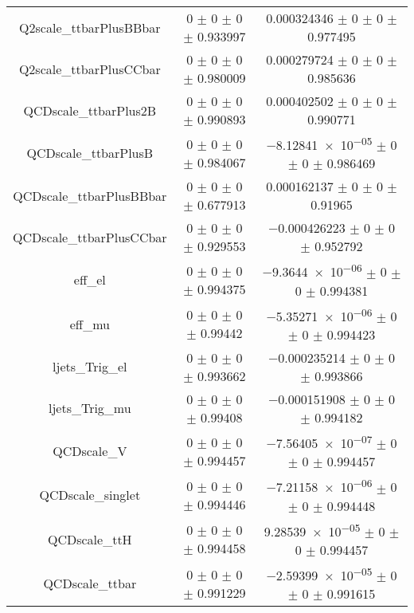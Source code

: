 \begin{table}
\begin{tabular}{ccc}
Q2scale\_ttbarPlusBBbar & \num{0} $\pm$ \num{0} $\pm$ \num{0} $\pm$ \num{0.933997} & \num{0.000324346} $\pm$ \num{0} $\pm$ \num{0} $\pm$ \num{0.977495}\\
Q2scale\_ttbarPlusCCbar & \num{0} $\pm$ \num{0} $\pm$ \num{0} $\pm$ \num{0.980009} & \num{0.000279724} $\pm$ \num{0} $\pm$ \num{0} $\pm$ \num{0.985636}\\
QCDscale\_ttbarPlus2B & \num{0} $\pm$ \num{0} $\pm$ \num{0} $\pm$ \num{0.990893} & \num{0.000402502} $\pm$ \num{0} $\pm$ \num{0} $\pm$ \num{0.990771}\\
QCDscale\_ttbarPlusB & \num{0} $\pm$ \num{0} $\pm$ \num{0} $\pm$ \num{0.984067} & \num{-8.12841e-05} $\pm$ \num{0} $\pm$ \num{0} $\pm$ \num{0.986469}\\
QCDscale\_ttbarPlusBBbar & \num{0} $\pm$ \num{0} $\pm$ \num{0} $\pm$ \num{0.677913} & \num{0.000162137} $\pm$ \num{0} $\pm$ \num{0} $\pm$ \num{0.91965}\\
QCDscale\_ttbarPlusCCbar & \num{0} $\pm$ \num{0} $\pm$ \num{0} $\pm$ \num{0.929553} & \num{-0.000426223} $\pm$ \num{0} $\pm$ \num{0} $\pm$ \num{0.952792}\\
eff\_el & \num{0} $\pm$ \num{0} $\pm$ \num{0} $\pm$ \num{0.994375} & \num{-9.3644e-06} $\pm$ \num{0} $\pm$ \num{0} $\pm$ \num{0.994381}\\
eff\_mu & \num{0} $\pm$ \num{0} $\pm$ \num{0} $\pm$ \num{0.99442} & \num{-5.35271e-06} $\pm$ \num{0} $\pm$ \num{0} $\pm$ \num{0.994423}\\
ljets\_Trig\_el & \num{0} $\pm$ \num{0} $\pm$ \num{0} $\pm$ \num{0.993662} & \num{-0.000235214} $\pm$ \num{0} $\pm$ \num{0} $\pm$ \num{0.993866}\\
ljets\_Trig\_mu & \num{0} $\pm$ \num{0} $\pm$ \num{0} $\pm$ \num{0.99408} & \num{-0.000151908} $\pm$ \num{0} $\pm$ \num{0} $\pm$ \num{0.994182}\\
QCDscale\_V & \num{0} $\pm$ \num{0} $\pm$ \num{0} $\pm$ \num{0.994457} & \num{-7.56405e-07} $\pm$ \num{0} $\pm$ \num{0} $\pm$ \num{0.994457}\\
QCDscale\_singlet & \num{0} $\pm$ \num{0} $\pm$ \num{0} $\pm$ \num{0.994446} & \num{-7.21158e-06} $\pm$ \num{0} $\pm$ \num{0} $\pm$ \num{0.994448}\\
QCDscale\_ttH & \num{0} $\pm$ \num{0} $\pm$ \num{0} $\pm$ \num{0.994458} & \num{9.28539e-05} $\pm$ \num{0} $\pm$ \num{0} $\pm$ \num{0.994457}\\
QCDscale\_ttbar & \num{0} $\pm$ \num{0} $\pm$ \num{0} $\pm$ \num{0.991229} & \num{-2.59399e-05} $\pm$ \num{0} $\pm$ \num{0} $\pm$ \num{0.991615}\\

\end{tabular}
\end{table}
